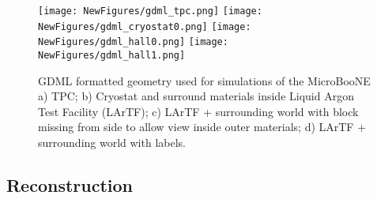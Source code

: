 \documentclass[12pt]{article}
\begin{document}
\begin{figure}[h!]
\centering
\texttt{[image: NewFigures/gdml\_tpc.png]}
\hspace{2 mm}
\texttt{[image: NewFigures/gdml\_cryostat0.png]}
\hspace{2 mm}
\texttt{[image: NewFigures/gdml\_hall0.png]}
\hspace{2 mm}
\texttt{[image: NewFigures/gdml\_hall1.png]}
\caption{GDML formatted geometry used for simulations of the MicroBooNE a) TPC; b) Cryostat and surround materials inside Liquid Argon Test Facility (LArTF); c) LArTF + surrounding world with block missing from side to allow view inside outer materials; d) LArTF + surrounding world with labels. }
\label{fig:gdml}
\end{figure}

\subsection{Reconstruction}
\end{document}
